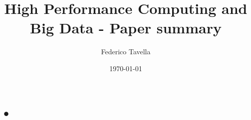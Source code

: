 \documentclass[a4paper]{article}
\title{High Performance Computing and Big Data - Paper summary}
\author{Federico Tavella}
\date{\today}
\begin{document}
\maketitle

\section{•}
\end{document}
